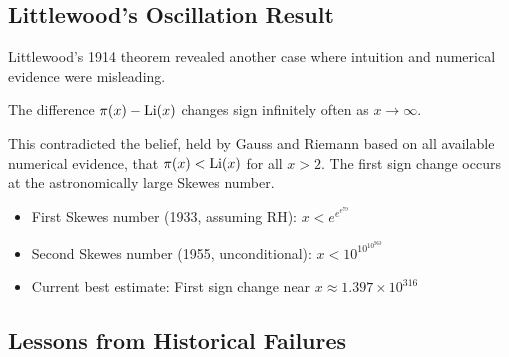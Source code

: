 \subsection{Littlewood's Oscillation Result}

Littlewood's 1914 theorem revealed another case where intuition and numerical evidence were misleading.

\begin{theorem}[Littlewood, 1914]
The difference $\pi(x) - \operatorname{Li}(x)$ changes sign infinitely often as $x \to \infty$.
\end{theorem}

This contradicted the belief, held by Gauss and Riemann based on all available numerical evidence, that $\pi(x) < \operatorname{Li}(x)$ for all $x > 2$. The first sign change occurs at the astronomically large Skewes number.

\begin{definition}
\begin{itemize}
\item First Skewes number (1933, assuming RH): $x < e^{e^{e^{79}}}$
\item Second Skewes number (1955, unconditional): $x < 10^{10^{10^{963}}}$
\item Current best estimate: First sign change near $x \approx 1.397 \times 10^{316}$ \cite{plattrigaux2020}
\end{itemize}
\end{definition}

\subsection{Lessons from Historical Failures}


